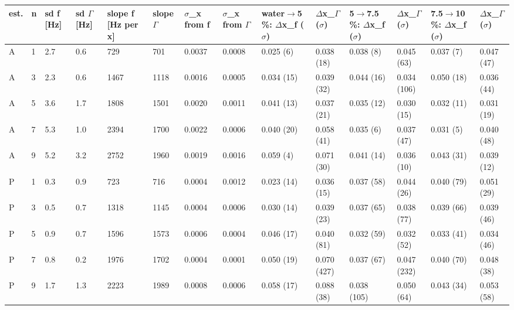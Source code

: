 \documentclass[11pt,a4paper]{article}
\begin{document}
\begin{landscape}{\scriptsize\setlength{\tabcolsep}{2pt}
\begin{longtable}{@{}llllllllllllll@{}}
\toprule
est. & n & sd f [Hz] & sd $\Gamma$ [Hz] & slope f [Hz per x] & slope $\Gamma$ & $\sigma$\_x from f & $\sigma$\_x from $\Gamma$ & water$\rightarrow$5 \%: $\Delta$x\_f ($\sigma$) & $\Delta$x\_$\Gamma$ ($\sigma$) & 5$\rightarrow$7.5 \%: $\Delta$x\_f ($\sigma$) & $\Delta$x\_$\Gamma$ ($\sigma$) & 7.5$\rightarrow$10 \%: $\Delta$x\_f ($\sigma$) & $\Delta$x\_$\Gamma$ ($\sigma$) \\\midrule\endhead
A & 1 & 2.7 & 0.6 & 729 & 701 & 0.0037 & 0.0008 & 0.025 (6) & 0.038 (18) & 0.038 (8) & 0.045 (63) & 0.037 (7) & 0.047 (47) \\
A & 3 & 2.3 & 0.6 & 1467 & 1118 & 0.0016 & 0.0005 & 0.034 (15) & 0.039 (32) & 0.044 (16) & 0.034 (106) & 0.050 (18) & 0.036 (44) \\
A & 5 & 3.6 & 1.7 & 1808 & 1501 & 0.0020 & 0.0011 & 0.041 (13) & 0.037 (21) & 0.035 (12) & 0.030 (15) & 0.032 (11) & 0.031 (19) \\
A & 7 & 5.3 & 1.0 & 2394 & 1700 & 0.0022 & 0.0006 & 0.040 (20) & 0.058 (41) & 0.035 (6) & 0.037 (47) & 0.031 (5) & 0.040 (48) \\
A & 9 & 5.2 & 3.2 & 2752 & 1960 & 0.0019 & 0.0016 & 0.059 (4) & 0.071 (30) & 0.041 (14) & 0.036 (10) & 0.043 (31) & 0.039 (12) \\
P & 1 & 0.3 & 0.9 & 723 & 716 & 0.0004 & 0.0012 & 0.023 (14) & 0.036 (15) & 0.037 (58) & 0.044 (26) & 0.040 (79) & 0.051 (29) \\
P & 3 & 0.5 & 0.7 & 1318 & 1145 & 0.0004 & 0.0006 & 0.030 (14) & 0.039 (23) & 0.037 (65) & 0.038 (77) & 0.039 (66) & 0.039 (46) \\
P & 5 & 0.9 & 0.7 & 1596 & 1573 & 0.0006 & 0.0004 & 0.046 (17) & 0.040 (81) & 0.032 (59) & 0.032 (52) & 0.033 (41) & 0.034 (46) \\
P & 7 & 0.8 & 0.2 & 1976 & 1702 & 0.0004 & 0.0001 & 0.050 (19) & 0.070 (427) & 0.037 (67) & 0.047 (232) & 0.040 (70) & 0.048 (38) \\
P & 9 & 1.7 & 1.3 & 2223 & 1989 & 0.0008 & 0.0006 & 0.058 (17) & 0.088 (38) & 0.038 (105) & 0.050 (64) & 0.043 (34) & 0.053 (58) \\
\bottomrule
\end{longtable}}\end{landscape}
\end{document}
